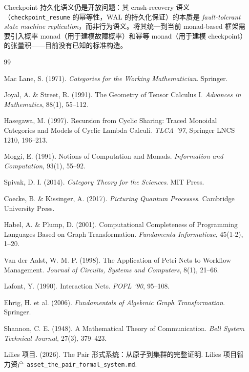 \documentclass[11pt,a4paper]{article}
\theoremstyle{definition}
\theoremstyle{definition}
\theoremstyle{remark}
\begin{document}
Checkpoint 持久化语义仍是开放问题：其 crash-recovery 语义（\texttt{checkpoint\_resume} 的幂等性，WAL 的持久化保证）的本质是 \emph{fault-tolerant state machine replication}，而非行为语义。将其统一到当前 monad-based 框架需要引入概率 monad（用于建模故障概率）和幂等 monad（用于建模 checkpoint）的张量积——目前没有已知的标准构造。


\begin{thebibliography}{99}

Mac Lane, S. (1971).
\textit{Categories for the Working Mathematician}.
Springer.

Joyal, A. \& Street, R. (1991).
The Geometry of Tensor Calculus I.
\textit{Advances in Mathematics}, 88(1), 55--112.

Hasegawa, M. (1997).
Recursion from Cyclic Sharing: Traced Monoidal Categories and Models of Cyclic Lambda Calculi.
\textit{TLCA '97}, Springer LNCS 1210, 196--213.

Moggi, E. (1991).
Notions of Computation and Monads.
\textit{Information and Computation}, 93(1), 55--92.

Spivak, D. I. (2014).
\textit{Category Theory for the Sciences}.
MIT Press.

Coecke, B. \& Kissinger, A. (2017).
\textit{Picturing Quantum Processes}.
Cambridge University Press.

Habel, A. \& Plump, D. (2001).
Computational Completeness of Programming Languages Based on Graph Transformation.
\textit{Fundamenta Informaticae}, 45(1-2), 1--20.

Van der Aalst, W. M. P. (1998).
The Application of Petri Nets to Workflow Management.
\textit{Journal of Circuits, Systems and Computers}, 8(1), 21--66.

Lafont, Y. (1990).
Interaction Nets.
\textit{POPL '90}, 95--108.

Ehrig, H. et al. (2006).
\textit{Fundamentals of Algebraic Graph Transformation}.
Springer.

Shannon, C. E. (1948).
A Mathematical Theory of Communication.
\textit{Bell System Technical Journal}, 27(3), 379--423.

Lilies 项目. (2026).
The Pair 形式系统：从原子到集群的完整证明.
Lilies 项目智力资产 \texttt{asset\_the\_pair\_formal\_system.md}.


\end{thebibliography}
\end{document}

